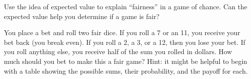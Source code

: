 \begin{xca}
Use the idea of expected value to explain ``fairness'' in a game of chance. Can the expected value help you determine if a game is fair?
\end{xca}

\begin{xca}
You place a bet and roll two fair dice. If you roll a 7 or an 11, you receive your bet back (you break even). If you roll a 2, a 3, or a 12, then you lose your bet.  If you roll anything else, you receive half of the sum you rolled in dollars. How much should you bet to make this a fair game? Hint: it might be helpful to begin with a table showing the possible sums, their probability, and the payoff for each. 
\end{xca}


